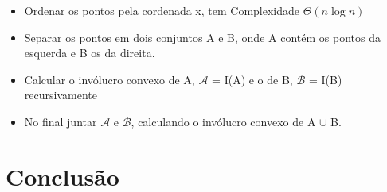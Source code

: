 \documentclass[11pt]{article}
\begin{document}
\begin{itemize}
    \item Ordenar os pontos pela cordenada x, tem Complexidade $\Theta(n\log{}n)$
    \item Separar os pontos em dois conjuntos A e B, onde A contém os pontos da esquerda e B os da direita.
    \item Calcular o invólucro convexo de A, $\mathcal{A}$ = I(A) e o de B, $\mathcal{B}$ = I(B) recursivamente
    \item No final juntar $\mathcal{A}$ e $\mathcal{B}$, calculando o invólucro convexo de A $\cup$ B.
\end{itemize}


\section{Conclusão}
\end{document}
